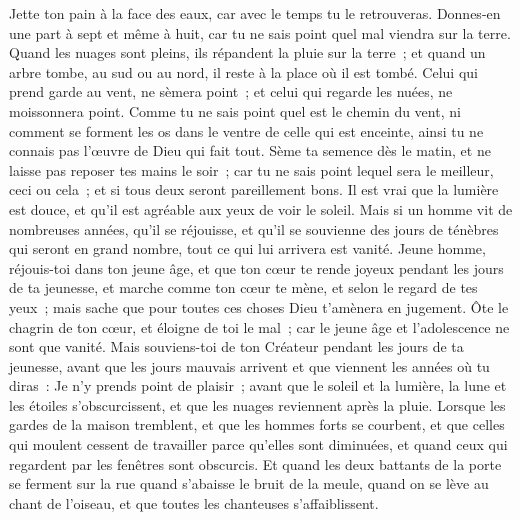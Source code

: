 \begin{multicols}{2}
\VerseOne{}Jette ton pain à la face des eaux, car avec le temps tu le retrouveras.
Donnes-en une part à sept et même à huit, car tu ne sais point quel mal viendra sur la terre.
Quand les nuages sont pleins, ils répandent la pluie sur la terre~; et quand un arbre tombe, au sud ou au nord, il reste à la place où il est tombé.
Celui qui prend garde au vent, ne sèmera point~; et celui qui regarde les nuées, ne moissonnera point. 
Comme tu ne sais point quel est le chemin du vent, ni comment se forment les os dans le ventre de celle qui est enceinte, ainsi tu ne connais pas l'œuvre de Dieu qui fait tout.
 Sème ta semence dès le matin, et ne laisse pas reposer tes mains le soir~; car tu ne sais point lequel sera le meilleur, ceci ou cela~; et si tous deux seront pareillement bons.
Il est vrai que la lumière est douce, et qu'il est agréable aux yeux de voir le soleil.
Mais si un homme vit de nombreuses années, qu'il se réjouisse, et qu'il se souvienne des jours de ténèbres qui seront en grand nombre, tout ce qui lui arrivera est vanité.
\VerseOne{}Jeune homme, réjouis-toi dans ton jeune âge, et que ton cœur te rende joyeux pendant les jours de ta jeunesse, et marche comme ton cœur te mène, et selon le regard de tes yeux~; mais sache que pour toutes ces choses Dieu t'amènera en jugement. 
Ôte le chagrin de ton cœur, et éloigne de toi le mal~; car le jeune âge et l'adolescence ne sont que vanité. 
Mais souviens-toi de ton Créateur pendant les jours de ta jeunesse, avant que les jours mauvais arrivent et que viennent les années où tu diras~: Je n'y prends point de plaisir~;
avant que le soleil et la lumière, la lune et les étoiles s'obscurcissent, et que les nuages reviennent après la pluie.
Lorsque les gardes de la maison tremblent, et que les hommes forts se courbent, et que celles qui moulent cessent de travailler parce qu'elles sont diminuées, et quand ceux qui regardent par les fenêtres sont obscurcis.
Et quand les deux battants de la porte se ferment sur la rue quand s'abaisse le bruit de la meule, quand on se lève au chant de l'oiseau, et que toutes les chanteuses s'affaiblissent.

\end{multicols}
